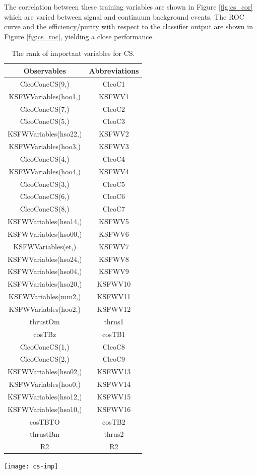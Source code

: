 The correlation between these training variables are shown in Figure \ref{fig:cs_cor} which are varied between signal and continuum background events. The ROC curve and the efficiency/purity with respect to the classifier output are shown in Figure \ref{fig:cs_roc}, yielding a close performance.
\begin{table}[htpb]
	\begin{minipage}[t]{0.5\linewidth}
		\centering
		\caption{Variables and the abbreviations for CS.}
		\label{tab:cs_abr}
		\begin{tabular}{c|c}
			\hline
			Observables &  Abbreviations\\
			\hline
			CleoConeCS(9,) &  CleoC1 \\
			KSFWVariables(hoo1,) & KSFWV1 \\
			CleoConeCS(7,) & CleoC2\\
			CleoConeCS(5,) & CleoC3\\
			KSFWVariables(hso22,) & KSFWV2\\
			KSFWVariables(hoo3,) & KSFWV3\\
			CleoConeCS(4,) & CleoC4 \\
			KSFWVariables(hoo4,) &  KSFWV4\\
			CleoConeCS(3,) & CleoC5 \\
			CleoConeCS(6,) & CleoC6\\
			CleoConeCS(8,) & CleoC7\\
			KSFWVariables(hso14,) &   KSFWV5\\
			KSFWVariables(hso00,) & KSFWV6\\
			KSFWVariables(et,) & KSFWV7\\
			KSFWVariables(hso24,) & KSFWV8\\
			KSFWVariables(hso04,) & KSFWV9\\
			KSFWVariables(hso20,) & KSFWV10 \\
			KSFWVariables(mm2,)  & KSFWV11\\
			KSFWVariables(hoo2,) &  KSFWV12\\
			thrustOm & thrus1 \\
			cosTBz & cosTB1\\
			CleoConeCS(1,) & CleoC8 \\
			CleoConeCS(2,) & CleoC9 \\
			KSFWVariables(hso02,) &  KSFWV13\\
			KSFWVariables(hoo0,) &  KSFWV14 \\
			KSFWVariables(hso12,) &  KSFWV15\\
			KSFWVariables(hso10,) & KSFWV16\\
			cosTBTO & cosTB2\\
			thrustBm & thrus2\\
			R2 & R2\\
			\hline
		\end{tabular}
	\end{minipage}
	\begin{minipage}[t]{0.4\linewidth}
		\centering 
		\caption{The rank of important variables for CS. }
		\label{tab:cs_imp}
		\texttt{[image: cs-imp]}
	\end{minipage}
\end{table}

